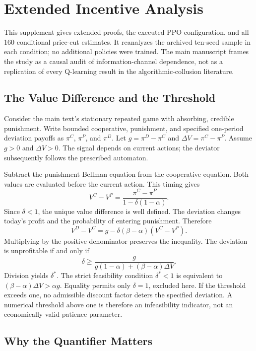 \section{Extended Incentive Analysis}

This supplement gives extended proofs, the executed PPO configuration, and all 160 conditional price-cut estimates. It reanalyzes the archived ten-seed sample in each condition; no additional policies were trained. The main manuscript frames the study as a causal audit of information-channel dependence, not as a replication of every Q-learning result in the algorithmic-collusion literature.

\subsection{The Value Difference and the Threshold}

Consider the main text's stationary repeated game with absorbing, credible punishment. Write bounded cooperative, punishment, and specified one-period deviation payoffs as $\pi^C$, $\pi^P$, and $\pi^D$. Let $g = \pi^D - \pi^C$ and $\Delta V = \pi^C - \pi^P$. Assume $g > 0$ and $\Delta V > 0$. The signal depends on current actions; the deviator subsequently follows the prescribed automaton.

Subtract the punishment Bellman equation from the cooperative equation. Both values are evaluated before the current action. This timing gives
\[
V^C - V^P = \frac{\pi^C - \pi^P}{1 - \delta(1 - \alpha)}.
\]
Since $\delta < 1$, the unique value difference is well defined. The deviation changes today's profit and the probability of entering punishment. Therefore
\[
V^D - V^C = g - \delta(\beta - \alpha)(V^C - V^P).
\]
Multiplying by the positive denominator preserves the inequality. The deviation is unprofitable if and only if
\[
\delta \geq \frac{g}{g(1 - \alpha) + (\beta - \alpha)\Delta V}.
\]
Division yields $\delta^*$. The strict feasibility condition $\delta^* < 1$ is equivalent to $(\beta - \alpha)\Delta V > \alpha g$. Equality permits only $\delta = 1$, excluded here. If the threshold exceeds one, no admissible discount factor deters the specified deviation. A numerical threshold above one is therefore an infeasibility indicator, not an economically valid patience parameter.

\subsection{Why the Quantifier Matters}


